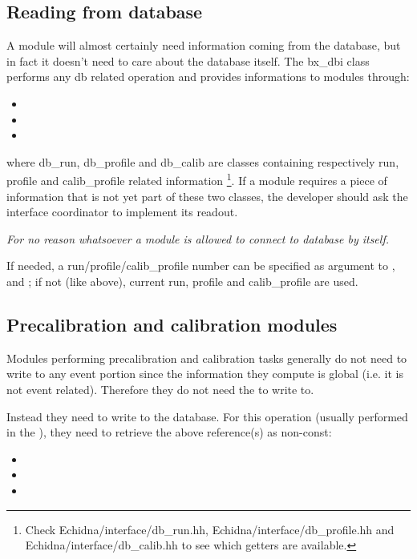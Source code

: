 \subsection{Reading from database}

A module will almost certainly need information coming from the database, but in fact it doesn't need to care about the database itself.
The bx\_dbi class performs any db related operation and provides informations to modules through:
\begin{itemize}
\item {}
\item {}
\item {}
\end{itemize}
where db\_run, db\_profile and db\_calib are classes containing respectively run, profile and calib\_profile related information
\footnote{Check Echidna/interface/db\_run.hh, Echidna/interface/db\_profile.hh and Echidna/interface/db\_calib.hh to see which getters are available.}.
If a module requires a piece of information that is not yet part of these two classes, the developer should ask the interface coordinator to implement its readout.

\emph{For no reason whatsoever a module is allowed to connect to database by itself.}

If needed, a run/profile/calib\_profile number can be specified as argument to ,  and ; if not (like above), current run, profile and calib\_profile are used.


\subsection{Precalibration and calibration modules}

Modules performing precalibration and calibration tasks generally do not need to write to any event portion since the information they compute is global (i.e. it is not event related).
Therefore they do not need the  to write to.

Instead they need to write to the database. For this operation (usually performed in the ), they need to retrieve the above reference(s) as non-const:

\begin{itemize}
\item {}
\item {}
\item {}
\end{itemize}

